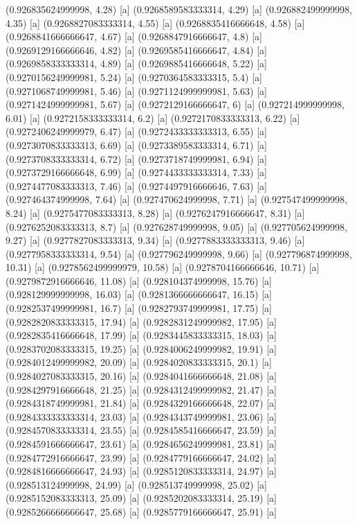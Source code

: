 {{{(0.926835624999998, 4.28) [a] 
(0.9268589583333314, 4.29) [a] 
(0.926882499999998, 4.35) [a] 
(0.9268827083333314, 4.55) [a] 
(0.9268835416666648, 4.58) [a] 
(0.9268841666666647, 4.67) [a] 
(0.9268847916666647, 4.8) [a] 
(0.9269129166666646, 4.82) [a] 
(0.9269585416666647, 4.84) [a] 
(0.9269858333333314, 4.89) [a] 
(0.9269885416666648, 5.22) [a] 
(0.9270156249999981, 5.24) [a] 
(0.9270364583333315, 5.4) [a] 
(0.9271068749999981, 5.46) [a] 
(0.9271124999999981, 5.63) [a] 
(0.9271424999999981, 5.67) [a] 
(0.9272129166666647, 6) [a] 
(0.927214999999998, 6.01) [a] 
(0.9272158333333314, 6.2) [a] 
(0.9272170833333313, 6.22) [a] 
(0.9272406249999979, 6.47) [a] 
(0.9272433333333313, 6.55) [a] 
(0.9273070833333313, 6.69) [a] 
(0.9273389583333314, 6.71) [a] 
(0.9273708333333314, 6.72) [a] 
(0.9273718749999981, 6.94) [a] 
(0.9273729166666648, 6.99) [a] 
(0.9274433333333314, 7.33) [a] 
(0.9274477083333313, 7.46) [a] 
(0.9274497916666646, 7.63) [a] 
(0.927464374999998, 7.64) [a] 
(0.927470624999998, 7.71) [a] 
(0.927547499999998, 8.24) [a] 
(0.9275477083333313, 8.28) [a] 
(0.9276247916666647, 8.31) [a] 
(0.9276252083333313, 8.7) [a] 
(0.927628749999998, 9.05) [a] 
(0.927705624999998, 9.27) [a] 
(0.9277827083333313, 9.34) [a] 
(0.9277883333333313, 9.46) [a] 
(0.9277958333333314, 9.54) [a] 
(0.927796249999998, 9.66) [a] 
(0.927796874999998, 10.31) [a] 
(0.9278562499999979, 10.58) [a] 
(0.9278704166666646, 10.71) [a] 
(0.9279872916666646, 11.08) [a] 
(0.928104374999998, 15.76) [a] 
(0.928129999999998, 16.03) [a] 
(0.9281366666666647, 16.15) [a] 
(0.9282537499999981, 16.7) [a] 
(0.9282793749999981, 17.75) [a] 
(0.9282820833333315, 17.94) [a] 
(0.9282831249999982, 17.95) [a] 
(0.9282835416666648, 17.99) [a] 
(0.9283445833333315, 18.03) [a] 
(0.9283702083333315, 19.25) [a] 
(0.9284006249999982, 19.91) [a] 
(0.9284012499999982, 20.09) [a] 
(0.9284020833333315, 20.1) [a] 
(0.9284027083333315, 20.16) [a] 
(0.9284041666666648, 21.08) [a] 
(0.9284297916666648, 21.25) [a] 
(0.9284312499999982, 21.47) [a] 
(0.9284318749999981, 21.84) [a] 
(0.9284329166666648, 22.07) [a] 
(0.9284333333333314, 23.03) [a] 
(0.9284343749999981, 23.06) [a] 
(0.9284570833333314, 23.55) [a] 
(0.9284585416666647, 23.59) [a] 
(0.9284591666666647, 23.61) [a] 
(0.9284656249999981, 23.81) [a] 
(0.9284772916666647, 23.99) [a] 
(0.9284779166666647, 24.02) [a] 
(0.9284816666666647, 24.93) [a] 
(0.9285120833333314, 24.97) [a] 
(0.928513124999998, 24.99) [a] 
(0.928513749999998, 25.02) [a] 
(0.9285152083333313, 25.09) [a] 
(0.9285202083333314, 25.19) [a] 
(0.9285266666666647, 25.68) [a] 
(0.9285779166666647, 25.91) [a] 
}}}

